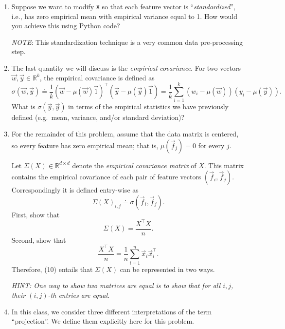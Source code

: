 \documentclass[10pt]{article}
\theoremstyle{definition}
\theoremstyle{plain}
\newcommand{\RR}{\mathbb{R}}
\begin{document}
\begin{enumerate}[label=(\alph*)]
\item Suppose we want to modify \texttt{X} so that each feature vector is ``\textit{standardized}'', i.e., has zero empirical mean with empirical variance equal to 1. How would you achieve this using Python code?

\textit{NOTE}: This standardization technique is a very common data pre-processing step.

\item The last quantity we will discuss is the \textit{empirical covariance}. For two vectors $\vec{w}, \vec{y} \in \RR^k$, the empirical covariance is defined as
\begin{equation}
\sigma(\vec{w}, \vec{y}) \doteq \frac{1}{k} \left( \vec{w} - \mu(\vec{w})\vec{1} \right)^\top \left( \vec{y} - \mu(\vec{y})\vec{1} \right) = \frac{1}{k} \sum_{i=1}^{k} (w_i - \mu(\vec{w}))(y_i - \mu(\vec{y})).
\end{equation}
What is $\sigma(\vec{y}, \vec{y})$ in terms of the empirical statistics we have previously defined (e.g.\ mean, variance, and/or standard deviation)?

\item For the remainder of this problem, assume that the data matrix is centered, so every feature has zero empirical mean; that is, $\mu(\vec{f}_j) = 0$ for every $j$.

Let $\Sigma(X) \in \RR^{d \times d}$ denote the \textit{empirical covariance matrix} of $X$. This matrix contains the empirical covariance of each pair of feature vectors $(\vec{f}_i, \vec{f}_j)$. Correspondingly it is defined entry-wise as
\begin{equation}
\Sigma(X)_{i,j} \doteq \sigma(\vec{f}_i, \vec{f}_j).
\end{equation}
First, show that
\begin{equation}
\Sigma(X) = \frac{X^\top X}{n}.
\end{equation}
Second, show that
\begin{equation}
\frac{X^\top X}{n} = \frac{1}{n} \sum_{i=1}^{n} \vec{x}_i \vec{x}_i^\top.
\end{equation}
Therefore, (10) entails that $\Sigma(X)$ can be represented in two ways.

\textit{HINT: One way to show two matrices are equal is to show that for all $i, j$, their $(i,j)$-th entries are equal.}

\item In this class, we consider three different interpretations of the term ``projection''. We define them explicitly here for this problem.


\end{enumerate}
\end{document}
